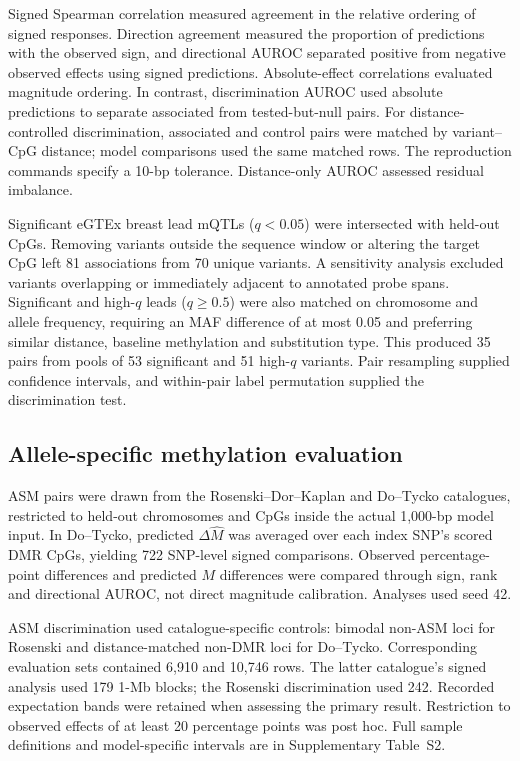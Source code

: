\documentclass[11pt,letterpaper,twocolumn]{article}
\begin{document}
Signed Spearman correlation measured agreement in the relative ordering of signed responses. Direction agreement measured the proportion of predictions with the observed sign, and directional AUROC separated positive from negative observed effects using signed predictions. Absolute-effect correlations evaluated magnitude ordering. In contrast, discrimination AUROC used absolute predictions to separate associated from tested-but-null pairs. For distance-controlled discrimination, associated and control pairs were matched by variant--CpG distance; model comparisons used the same matched rows. The reproduction commands specify a 10-bp tolerance. Distance-only AUROC assessed residual imbalance.

Significant eGTEx breast lead mQTLs ($q<0.05$) were intersected with held-out CpGs. Removing variants outside the sequence window or altering the target CpG left 81 associations from 70 unique variants. A sensitivity analysis excluded variants overlapping or immediately adjacent to annotated probe spans. Significant and high-$q$ leads ($q\geq0.5$) were also matched on chromosome and allele frequency, requiring an MAF difference of at most 0.05 and preferring similar distance, baseline methylation and substitution type. This produced 35 pairs from pools of 53 significant and 51 high-$q$ variants. Pair resampling supplied confidence intervals, and within-pair label permutation supplied the discrimination test.

\subsection{Allele-specific methylation evaluation}
ASM pairs were drawn from the Rosenski--Dor--Kaplan and Do--Tycko catalogues, restricted to held-out chromosomes and CpGs inside the actual 1,000-bp model input. In Do--Tycko, predicted $\Delta\widehat M$ was averaged over each index SNP's scored DMR CpGs, yielding 722 SNP-level signed comparisons. Observed percentage-point differences and predicted $M$ differences were compared through sign, rank and directional AUROC, not direct magnitude calibration. Analyses used seed 42.

ASM discrimination used catalogue-specific controls: bimodal non-ASM loci for Rosenski and distance-matched non-DMR loci for Do--Tycko. Corresponding evaluation sets contained 6,910 and 10,746 rows. The latter catalogue's signed analysis used 179 1-Mb blocks; the Rosenski discrimination used 242. Recorded expectation bands were retained when assessing the primary result. Restriction to observed effects of at least 20 percentage points was post hoc. Full sample definitions and model-specific intervals are in Supplementary Table~S2.
\end{document}

